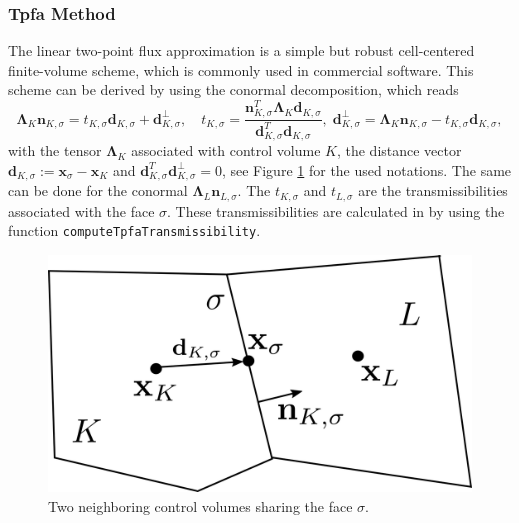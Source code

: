\subsubsection{Tpfa Method}\label{cc_tpfa}
The linear two-point flux approximation is a simple but robust cell-centered finite-volume scheme, which is commonly used in commercial software. 
This scheme can be derived by using the conormal decomposition, which reads
\begin{equation}
\mathbf{\Lambda}_K \mathbf{n}_{K, \sigma} = t_{K,\sigma} \mathbf{d}_{K,\sigma} + \mathbf{d}^{\bot}_{K,\sigma}, \quad  t_{K,\sigma} = \frac{\mathbf{n}_{K, \sigma}^T \mathbf{\Lambda}_K \mathbf{d}_{K,\sigma} }{\mathbf{d}_{K,\sigma}^T \mathbf{d}_{K,\sigma}}, \; \mathbf{d}^{\bot}_{K,\sigma} = \mathbf{\Lambda}_K \mathbf{n}_{K, \sigma} - t_{K,\sigma} \mathbf{d}_{K,\sigma},
\label{eq:conormalDecTpfa}
\end{equation}
with the tensor $\mathbf{\Lambda}_K$ associated with control volume $K$, the distance vector $\mathbf{d}_{K,\sigma} := \mathbf{x}_\sigma - \mathbf{x}_K$ and $\mathbf{d}_{K,\sigma}^T \mathbf{d}^{\bot}_{K,\sigma} = 0$, see Figure \ref{pc:cctpfa} for the used notations. The same can be done for the conormal $\mathbf{\Lambda}_L \mathbf{n}_{L, \sigma}$. The $t_{K,\sigma}$ and $t_{L,\sigma}$ are the transmissibilities associated with the face $\sigma$. These transmissibilities are calculated in \Dumux by using the function \texttt{computeTpfaTransmissibility}.

\begin{figure} [ht]
\centering
\includegraphics[width=0.4\linewidth,keepaspectratio]{png/cctpfa.png}
\caption{Two neighboring control volumes sharing the face $\sigma$.}
\label{pc:cctpfa}
\end{figure}


